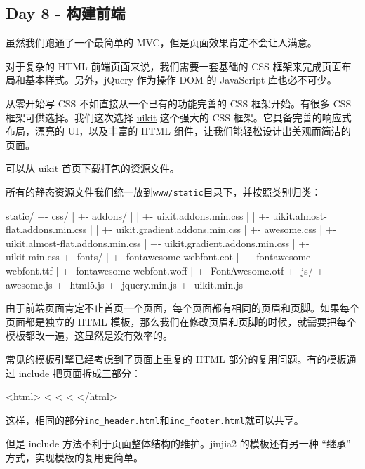 \hypertarget{day-8---ux6784ux5efaux524dux7aef}{%
\subsection{Day 8 - 构建前端}\label{day-8---ux6784ux5efaux524dux7aef}}

虽然我们跑通了一个最简单的 MVC，但是页面效果肯定不会让人满意。

对于复杂的 HTML 前端页面来说，我们需要一套基础的 CSS
框架来完成页面布局和基本样式。另外，jQuery 作为操作 DOM 的 JavaScript
库也必不可少。

从零开始写 CSS 不如直接从一个已有的功能完善的 CSS 框架开始。有很多 CSS
框架可供选择。我们这次选择 \href{http://getuikit.com/}{uikit} 这个强大的
CSS 框架。它具备完善的响应式布局，漂亮的 UI，以及丰富的 HTML
组件，让我们能轻松设计出美观而简洁的页面。

可以从 \href{http://getuikit.com/}{uikit 首页}下载打包的资源文件。

所有的静态资源文件我们统一放到\texttt{www/static}目录下，并按照类别归类：

\begin{pythoncode}
static/
+- css/
|  +- addons/
|  |  +- uikit.addons.min.css
|  |  +- uikit.almost-flat.addons.min.css
|  |  +- uikit.gradient.addons.min.css
|  +- awesome.css
|  +- uikit.almost-flat.addons.min.css
|  +- uikit.gradient.addons.min.css
|  +- uikit.min.css
+- fonts/
|  +- fontawesome-webfont.eot
|  +- fontawesome-webfont.ttf
|  +- fontawesome-webfont.woff
|  +- FontAwesome.otf
+- js/
   +- awesome.js
   +- html5.js
   +- jquery.min.js
   +- uikit.min.js
\end{pythoncode}

由于前端页面肯定不止首页一个页面，每个页面都有相同的页眉和页脚。如果每个页面都是独立的
HTML
模板，那么我们在修改页眉和页脚的时候，就需要把每个模板都改一遍，这显然是没有效率的。

常见的模板引擎已经考虑到了页面上重复的 HTML 部分的复用问题。有的模板通过
include 把页面拆成三部分：

\begin{pythoncode}
<html>
    <%
    <%
    <%
</html>
\end{pythoncode}

这样，相同的部分\texttt{inc\_header.html}和\texttt{inc\_footer.html}就可以共享。

但是 include 方法不利于页面整体结构的维护。jinjia2 的模板还有另一种
``继承'' 方式，实现模板的复用更简单。

